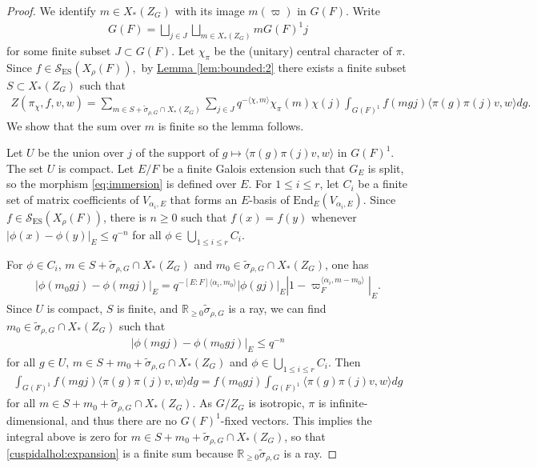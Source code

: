 \documentclass[10pt]{amsart}
\theoremstyle{definition}
\numberwithin{equation}{section}
\numberwithin{equation}{subsection}
\begin{document}
\begin{proof}
    We identify $m\in X_\ast(Z_G)$ with its image $m(\varpi)$ in $G(F)$. Write
    \begin{align*}
        G(F)=\bigsqcup_{j\in J}\bigsqcup_{m\in X_\ast(Z_G)} mG(F)^1j
    \end{align*}
    for some finite subset $J\subset G(F)$. Let $\chi_\pi$ be the (unitary) central character of $\pi$. Since $f\in \mathcal{S}_{\mathrm{ES}}(X_\rho(F)),$ by \hyperref[lem:bounded:2]{Lemma \ref{lem:bounded:2}} there exists a finite subset $S\subset X_*(Z_G)$ such that 
    \begin{align}\label{cuspidalhol:expansion}
        Z(\pi_\chi,f,v,w)=\sum_{m\in S+\widetilde{\sigma}_{\rho,G}\cap X_\ast(Z_G)} \sum_{j\in J}q^{-\langle \chi,m\rangle}\chi_\pi(m)\chi(j)\int_{G(F)^1} f(mgj)\langle \pi(g)\pi(j)v,w\rangle dg.
    \end{align}
    We show that the sum over $m$ is finite so the lemma follows.

    Let $U$ be the union over $j$ of the support of $g\mapsto \langle \pi(g)\pi(j)v,w\rangle$ in $G(F)^1.$ The set $U$ is compact. Let $E/F$ be a finite Galois extension such that $G_E$ is split, so the morphism \eqref{eq:immersion} is defined over $E$. For $1\leq i\leq r$, let $C_i$ be a finite set of matrix coefficients of $V_{\alpha_i,E}$ that forms an $E$-basis of $\mathrm{End}_E(V_{\alpha_i,E})$. Since $f\in\mathcal{S}_{\mathrm{ES}}(X_\rho(F))$, there is $n\geq 0$ such that $f(x)=f(y)$ whenever $|\phi(x) - \phi(y)|_E \leq q^{-n}$ for all $\phi\in \bigcup\limits_{1\leq i\leq r}C_i$.
    
    For $\phi\in C_i$, $m\in S+\widetilde{\sigma}_{\rho,G}\cap X_\ast(Z_G)$ and $m_0\in \widetilde{\sigma}_{\rho,G}\cap X_\ast(Z_G)$, one has 
    \begin{align*}
        |\phi(m_0gj) - \phi(mgj)|_E = q^{-[E:F]\langle\alpha_i,m_0\rangle}|\phi(gj)|_E |1-\varpi_F^{\langle\alpha_i,m-m_0\rangle}|_E.
    \end{align*}
    Since $U$ is compact, $S$ is finite, and $\mathbb{R}_{\geq 0}\widetilde{\sigma}_{\rho,G}$ is a ray, we can find $m_0\in\widetilde{\sigma}_{\rho,G}\cap X_\ast(Z_G)$ such that
    \begin{align*}
        |\phi(mgj) - \phi(m_0gj)|_E \leq q^{-n}
    \end{align*}
    for all $g\in U$, $m\in S+m_0+\widetilde{\sigma}_{\rho,G}\cap X_\ast(Z_G)$ and $\phi\in \bigcup\limits_{1\leq i\leq r}C_i$. Then
    \begin{align*}
        \int_{G(F)^1} f(mgj)\langle \pi(g)\pi(j)v,w\rangle dg=f(m_0gj)\int_{G(F)^1} \langle \pi(g)\pi(j)v,w\rangle dg
    \end{align*}
    for all $m\in S+m_0+\widetilde{\sigma}_{\rho,G}\cap X_{\ast}(Z_G)$. As $G/Z_G$ is isotropic, $\pi$ is infinite-dimensional, and thus there are no $G(F)^1$-fixed vectors. This implies the integral above is zero for $m\in S+m_0+\widetilde{\sigma}_{\rho,G}\cap X_\ast(Z_G)$, so that \eqref{cuspidalhol:expansion} is a finite sum because $\mathbb{R}_{\geq 0}\widetilde{\sigma}_{\rho,G}$ is a ray.
\end{proof}
\end{document}
